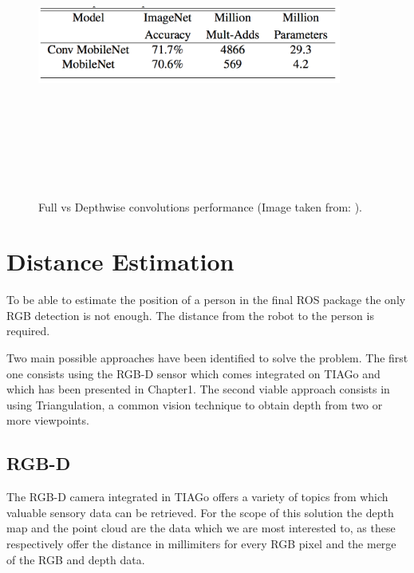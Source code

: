 \begin{figure}[!htbp]
\begin{center}
\includegraphics[width=10cm,height=10cm,keepaspectratio]{images/mobileNet_table.png}
\end{center}
\caption{Full vs Depthwise convolutions performance (Image taken from: \cite{paper:MobileNets}).}
\end{figure}

\section{Distance Estimation}

To be able to estimate the position of a person in the final ROS package the only RGB detection is not enough. The distance from the robot to the person is required.

Two main possible approaches have been identified to solve the problem. The first one consists using the RGB-D sensor which comes integrated on TIAGo and which has been presented in Chapter1. The second viable approach consists in using Triangulation, a common vision technique to obtain depth from two or more viewpoints.

\subsection{RGB-D}

The RGB-D camera integrated in TIAGo offers a variety of topics from which valuable sensory data can be retrieved. For the scope of this solution the depth map and the point cloud are the data which we are most interested to, as these respectively offer the distance in millimiters for every RGB pixel and the merge of the RGB and depth data.

